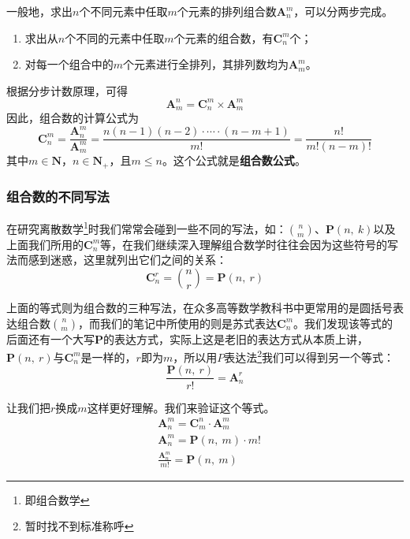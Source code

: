 \documentclass[a5paper]{article}
\begin{document}
一般地，求出$n$个不同元素中任取$m$个元素的排列组合数$\textbf{A}_{n}^m$，可以分两步完成。
\begin{enumerate}
    \item 求出从$n$个不同的元素中任取$m$个元素的组合数，有$\textbf{C}_n^{m}$个；
    \item 对每一个组合中的$m$个元素进行全排列，其排列数均为$\textbf{A}_{m}^{m}$。
\end{enumerate}
根据分步计数原理，可得
\begin{equation}
    \textbf{A}_{m}^{n} = \textbf{C}_{n}^{m} \times \textbf{A}_{m}^{m}
\end{equation}
因此，组合数的计算公式为
\begin{equation}
    \textbf{C}_{n}^{m}=\frac{\textbf{A}_{n}^{m}}{\textbf{A}_{m}^{m}}=\frac{n(n-1)(n-2)\cdot{}\cdots{}\cdot{}(n-m+1)}{m!}=\frac{n!}{m!(n-m)!}
\end{equation}
其中$m \in \mathbf{N}$，$n \in \mathbf{N}_{+}$，且$m \le n$。这个公式就是\textbf{组合数公式}。

\subsubsection{组合数的不同写法}

在研究离散数学\footnote{即组合数学}时我们常常会碰到一些不同的写法，如：$\binom{n}{m}$、$\textbf{P}(n,~k)$以及上面我们所用的$\textbf{C}_{n}^m$等，在我们继续深入理解组合数学时往往会因为这些符号的写法而感到迷惑，这里就列出它们之间的关系：
\begin{equation*}
    \textbf{C}_{n}^{r} = \binom{n}{r} = \textbf{P}(n,~r)
\end{equation*}

上面的等式则为组合数的三种写法，在众多高等数学教科书中更常用的是圆括号表达组合数$\binom{n}{m}$，而我们的笔记中所使用的则是苏式表达$\textbf{C}_{n}^m$。我们发现该等式的后面还有一个大写$\textbf{P}$的表达方式，实际上这是老旧的表达方式从本质上讲，$\textbf{P}(n,~r)$与$\textbf{C}_{n}^m$是一样的，$r$即为$m$，所以用$P$表达法\footnote{暂时找不到标准称呼}我们可以得到另一个等式：
\begin{equation}
    \frac{\textbf{P}(n,~r)}{r!} = \textbf{A}_{n}^r
\end{equation}

让我们把$r$换成$m$这样更好理解。我们来验证这个等式。
\begin{equation*}
    \begin{aligned}
        &\textbf{A}_{n}^m = \textbf{C}_{m}^n \cdot \textbf{A}_{m}^{m} \\
        &\textbf{A}_{n}^m = \textbf{P}(n,~m) \cdot m! \\
        &\frac{\textbf{A}_{n}^m}{m!} = \textbf{P}(n,~m)
    \end{aligned}
\end{equation*}
\end{document}
